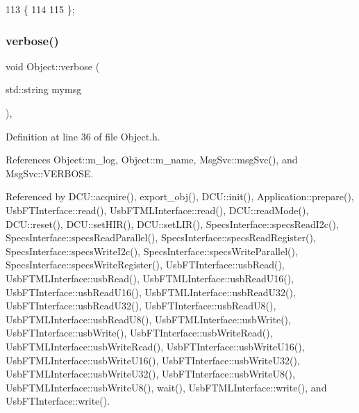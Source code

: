 \begin{DoxyCode}
113                  \{
114     
115   \};
\end{DoxyCode}
\mbox{\label{classObject_a83d2db2df682907ea1115ad721c1c4a1}} 
\subsubsection{\texorpdfstring{verbose()}{verbose()}\hspace{0.1cm}{\footnotesize\ttfamily [1/2]}}
{\footnotesize\ttfamily void Object\+::verbose (\begin{DoxyParamCaption}\item[{std\+::string}]{mymsg }\end{DoxyParamCaption})\hspace{0.3cm}{\ttfamily [inline]}, {\ttfamily [inherited]}}



Definition at line 36 of file Object.\+h.



References Object\+::m\+\_\+log, Object\+::m\+\_\+name, Msg\+Svc\+::msg\+Svc(), and Msg\+Svc\+::\+V\+E\+R\+B\+O\+SE.



Referenced by D\+C\+U\+::acquire(), export\+\_\+obj(), D\+C\+U\+::init(), Application\+::prepare(), Usb\+F\+T\+Interface\+::read(), Usb\+F\+T\+M\+L\+Interface\+::read(), D\+C\+U\+::read\+Mode(), D\+C\+U\+::reset(), D\+C\+U\+::set\+H\+I\+R(), D\+C\+U\+::set\+L\+I\+R(), Specs\+Interface\+::specs\+Read\+I2c(), Specs\+Interface\+::specs\+Read\+Parallel(), Specs\+Interface\+::specs\+Read\+Register(), Specs\+Interface\+::specs\+Write\+I2c(), Specs\+Interface\+::specs\+Write\+Parallel(), Specs\+Interface\+::specs\+Write\+Register(), Usb\+F\+T\+Interface\+::usb\+Read(), Usb\+F\+T\+M\+L\+Interface\+::usb\+Read(), Usb\+F\+T\+M\+L\+Interface\+::usb\+Read\+U16(), Usb\+F\+T\+Interface\+::usb\+Read\+U16(), Usb\+F\+T\+M\+L\+Interface\+::usb\+Read\+U32(), Usb\+F\+T\+Interface\+::usb\+Read\+U32(), Usb\+F\+T\+Interface\+::usb\+Read\+U8(), Usb\+F\+T\+M\+L\+Interface\+::usb\+Read\+U8(), Usb\+F\+T\+M\+L\+Interface\+::usb\+Write(), Usb\+F\+T\+Interface\+::usb\+Write(), Usb\+F\+T\+Interface\+::usb\+Write\+Read(), Usb\+F\+T\+M\+L\+Interface\+::usb\+Write\+Read(), Usb\+F\+T\+Interface\+::usb\+Write\+U16(), Usb\+F\+T\+M\+L\+Interface\+::usb\+Write\+U16(), Usb\+F\+T\+Interface\+::usb\+Write\+U32(), Usb\+F\+T\+M\+L\+Interface\+::usb\+Write\+U32(), Usb\+F\+T\+Interface\+::usb\+Write\+U8(), Usb\+F\+T\+M\+L\+Interface\+::usb\+Write\+U8(), wait(), Usb\+F\+T\+M\+L\+Interface\+::write(), and Usb\+F\+T\+Interface\+::write().



